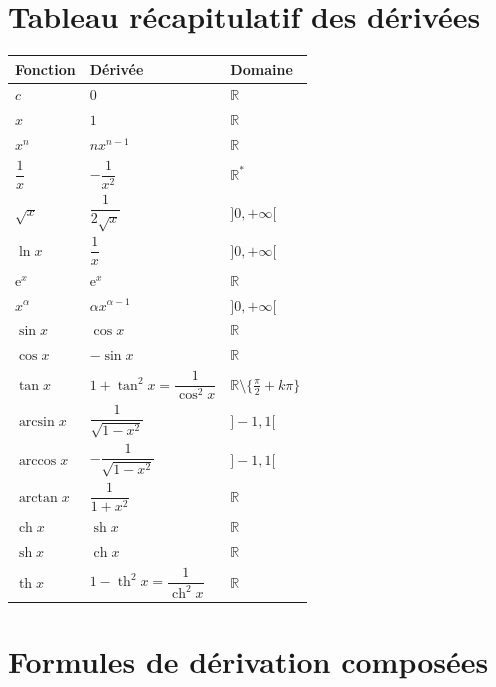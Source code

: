\documentclass[11pt,a4paper]{article}
\newcommand{\R}{\mathbb{R}}
\newcommand{\e}{\mathrm{e}}
\newcommand{\ch}{\operatorname{ch}}
\newcommand{\sh}{\operatorname{sh}}
\newcommand{\thh}{\operatorname{th}}
\begin{document}
\section{Tableau récapitulatif des dérivées}

\renewcommand{\arraystretch}{1.6}
\begin{center}
\begin{tabular}{|>{\centering\arraybackslash}m{5cm}|>{\centering\arraybackslash}m{5cm}|>{\centering\arraybackslash}m{4cm}|}
\hline
\textbf{Fonction} & \textbf{Dérivée} & \textbf{Domaine} \\
\hline
$c$ & $0$ & $\R$ \\
\hline
$x$ & $1$ & $\R$ \\
\hline
$x^n$ & $nx^{n-1}$ & $\R$ \\
\hline
$\dfrac1x$ & $-\dfrac1{x^2}$ & $\R^\ast$ \\
\hline
$\sqrt{x}$ & $\dfrac1{2\sqrt{x}}$ & $]0,+\infty[$ \\
\hline
$\ln x$ & $\dfrac1x$ & $]0,+\infty[$ \\
\hline
$\e^x$ & $\e^x$ & $\R$ \\
\hline
$x^\alpha$ & $\alpha x^{\alpha-1}$ & $]0,+\infty[$ \\
\hline
$\sin x$ & $\cos x$ & $\R$ \\
\hline
$\cos x$ & $-\sin x$ & $\R$ \\
\hline
$\tan x$ & $1+\tan^2x=\dfrac1{\cos^2x}$ & $\R\setminus\{\frac\pi2+k\pi\}$ \\
\hline
$\arcsin x$ & $\dfrac1{\sqrt{1-x^2}}$ & $]-1,1[$ \\
\hline
$\arccos x$ & $-\dfrac1{\sqrt{1-x^2}}$ & $]-1,1[$ \\
\hline
$\arctan x$ & $\dfrac1{1+x^2}$ & $\R$ \\
\hline
$\ch x$ & $\sh x$ & $\R$ \\
\hline
$\sh x$ & $\ch x$ & $\R$ \\
\hline
$\thh x$ & $1-\thh^2x=\dfrac1{\ch^2x}$ & $\R$ \\
\hline
\end{tabular}
\end{center}

\section{Formules de dérivation composées}
\end{document}
